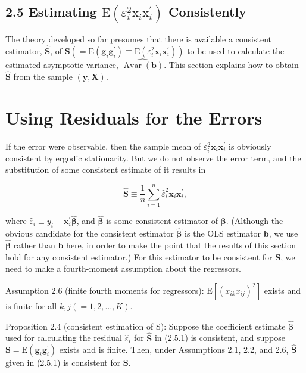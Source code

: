 \documentclass[10pt]{article}
\begin{document}
\subsection*{2.5 Estimating $\mathrm{E}\left(\varepsilon_{i}^{2} \mathrm{x}_{i} \mathrm{x}_{i}^{\prime}\right)$ Consistently}
The theory developed so far presumes that there is available a consistent estimator, $\widehat{\mathbf{S}}$, of $\mathbf{S}\left(=\mathrm{E}\left(\mathbf{g}_{i} \mathbf{g}_{i}^{\prime}\right) \equiv \mathrm{E}\left(\varepsilon_{i}^{2} \mathbf{x}_{i} \mathbf{x}_{i}^{\prime}\right)\right)$ to be used to calculate the estimated asymptotic variance, $\widehat{\operatorname{Avar}(\mathbf{b})}$. This section explains how to obtain $\widehat{\mathbf{S}}$ from the sample $(\mathbf{y}, \mathbf{X})$.

\section*{Using Residuals for the Errors}
If the error were observable, then the sample mean of $\varepsilon_{i}^{2} \mathbf{x}_{i} \mathbf{x}_{i}^{\prime}$ is obviously consistent by ergodic stationarity. But we do not observe the error term, and the substitution of some consistent estimate of it results in


\begin{equation*}
\widehat{\mathbf{S}} \equiv \frac{1}{n} \sum_{i=1}^{n} \hat{\varepsilon}_{i}^{2} \mathbf{x}_{i} \mathbf{x}_{i}^{\prime}, \tag{2.5.1}
\end{equation*}


where $\hat{\varepsilon}_{i} \equiv y_{i}-\mathbf{x}_{i}^{\prime} \widehat{\boldsymbol{\beta}}$, and $\widehat{\boldsymbol{\beta}}$ is some consistent estimator of $\boldsymbol{\beta}$. (Although the obvious candidate for the consistent estimator $\widehat{\boldsymbol{\beta}}$ is the OLS estimator $\mathbf{b}$, we use $\widehat{\boldsymbol{\beta}}$ rather than $\mathbf{b}$ here, in order to make the point that the results of this section hold for any consistent estimator.) For this estimator to be consistent for $\mathbf{S}$, we need to make a fourth-moment assumption about the regressors.

Assumption 2.6 (finite fourth moments for regressors): $\mathrm{E}\left[\left(x_{i k} x_{i j}\right)^{2}\right]$ exists and is finite for all $k, j(=1,2, \ldots, K)$.

Proposition 2.4 (consistent estimation of S): Suppose the coefficient estimate $\widehat{\boldsymbol{\beta}}$ used for calculating the residual $\hat{\varepsilon}_{i}$ for $\widehat{\mathbf{S}}$ in (2.5.1) is consistent, and suppose $\mathbf{S}=\mathrm{E}\left(\mathbf{g}_{i} \mathbf{g}_{i}^{\prime}\right)$ exists and is finite. Then, under Assumptions 2.1, 2.2, and 2.6, $\widehat{\mathbf{S}}$ given in (2.5.1) is consistent for $\mathbf{S}$.
\end{document}
